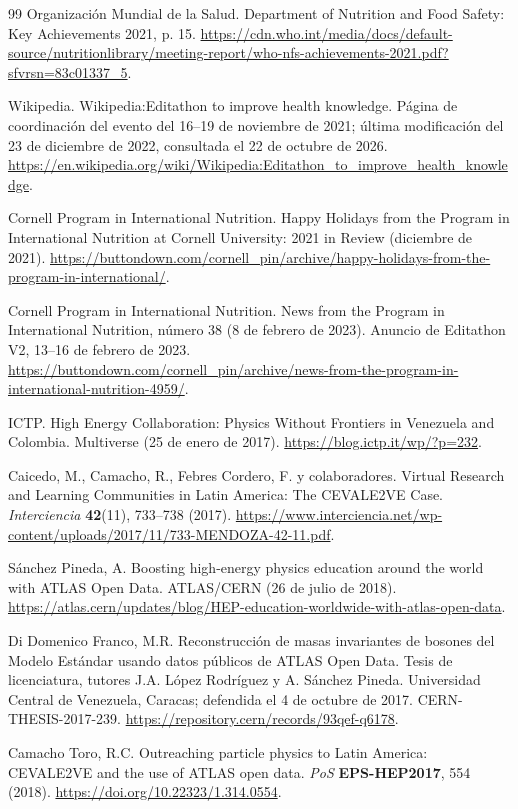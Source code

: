 \begin{thebibliography}{99}
 Organización Mundial de la Salud. Department of Nutrition and Food Safety: Key Achievements 2021, p. 15. \url{https://cdn.who.int/media/docs/default-source/nutritionlibrary/meeting-report/who-nfs-achievements-2021.pdf?sfvrsn=83c01337_5}.

 Wikipedia. Wikipedia:Editathon to improve health knowledge. Página de coordinación del evento del 16--19 de noviembre de 2021; última modificación del 23 de diciembre de 2022, consultada el 22 de octubre de 2026. \url{https://en.wikipedia.org/wiki/Wikipedia:Editathon_to_improve_health_knowledge}.

 Cornell Program in International Nutrition. Happy Holidays from the Program in International Nutrition at Cornell University: 2021 in Review (diciembre de 2021). \url{https://buttondown.com/cornell_pin/archive/happy-holidays-from-the-program-in-international/}.

 Cornell Program in International Nutrition. News from the Program in International Nutrition, número 38 (8 de febrero de 2023). Anuncio de Editathon V2, 13--16 de febrero de 2023. \url{https://buttondown.com/cornell_pin/archive/news-from-the-program-in-international-nutrition-4959/}.

 ICTP. High Energy Collaboration: Physics Without Frontiers in Venezuela and Colombia. Multiverse (25 de enero de 2017). \url{https://blog.ictp.it/wp/?p=232}.

 Caicedo, M., Camacho, R., Febres Cordero, F. y colaboradores. Virtual Research and Learning Communities in Latin America: The CEVALE2VE Case. \emph{Interciencia} \textbf{42}(11), 733--738 (2017). \url{https://www.interciencia.net/wp-content/uploads/2017/11/733-MENDOZA-42-11.pdf}.

 Sánchez Pineda, A. Boosting high-energy physics education around the world with ATLAS Open Data. ATLAS/CERN (26 de julio de 2018). \url{https://atlas.cern/updates/blog/HEP-education-worldwide-with-atlas-open-data}.

 Di Domenico Franco, M.R. Reconstrucción de masas invariantes de bosones del Modelo Estándar usando datos públicos de ATLAS Open Data. Tesis de licenciatura, tutores J.A. López Rodríguez y A. Sánchez Pineda. Universidad Central de Venezuela, Caracas; defendida el 4 de octubre de 2017. CERN-THESIS-2017-239. \url{https://repository.cern/records/93qef-q6178}.

 Camacho Toro, R.C. Outreaching particle physics to Latin America: CEVALE2VE and the use of ATLAS open data. \emph{PoS} \textbf{EPS-HEP2017}, 554 (2018). \url{https://doi.org/10.22323/1.314.0554}.


\end{thebibliography}

